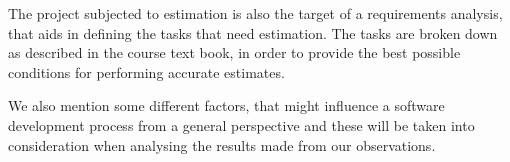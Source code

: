 The project subjected to estimation is also the target of a requirements analysis, that aids in defining the tasks that need estimation. The tasks are broken down as described in the course text book, in order to provide the best possible conditions for performing accurate estimates.

We also mention some different factors, that might influence a software development process from a general perspective and these will be taken into consideration when analysing the results made from our observations. \\


 



